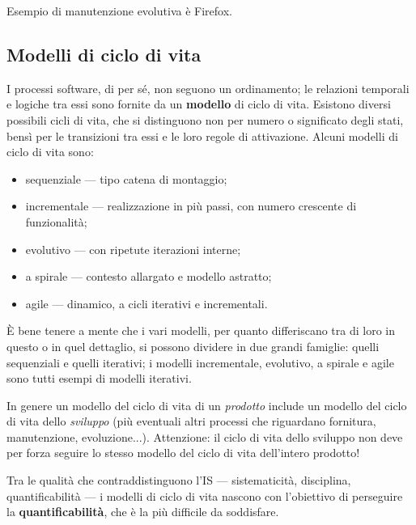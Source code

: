 \documentclass[a4paper]{article}
\begin{document}
		
Esempio di manutenzione evolutiva è Firefox.

		
	\subsection{Modelli di ciclo di vita}

		
I processi software, di per sé, non seguono un ordinamento; le relazioni temporali e logiche tra essi sono fornite da un \textbf{modello} di ciclo di vita. Esistono diversi possibili cicli di vita, che si distinguono non per numero o significato degli stati, bensì per le transizioni tra essi e le loro regole di attivazione. Alcuni modelli di ciclo di vita sono:
		
	\begin{itemize}
		
			
	\item sequenziale --- tipo catena di montaggio;
			
	\item incrementale --- realizzazione in più passi, con numero crescente di funzionalità;
			
	\item evolutivo --- con ripetute iterazioni interne;
			
	\item a spirale --- contesto allargato e modello astratto;
			
	\item agile --- dinamico, a cicli iterativi e incrementali.
		
	\end{itemize}

		
È bene tenere a mente che i vari modelli, per quanto differiscano tra di loro in questo o in quel dettaglio, si possono dividere in due grandi famiglie: quelli sequenziali e quelli iterativi; i modelli incrementale, evolutivo, a spirale e agile sono tutti esempi di modelli iterativi.
		
In genere un modello del ciclo di vita di un \emph{prodotto} include un modello del ciclo di vita dello \emph{sviluppo} (più eventuali altri processi che riguardano fornitura, manutenzione, evoluzione...). Attenzione: il ciclo di vita dello sviluppo non deve per forza seguire lo stesso modello del ciclo di vita dell'intero prodotto!
		
Tra le qualità che contraddistinguono l'IS --- sistematicità, disciplina, quantificabilità --- i modelli di ciclo di vita nascono con l'obiettivo di perseguire la \textbf{quantificabilità}, che è la più difficile da soddisfare.
\end{document}
